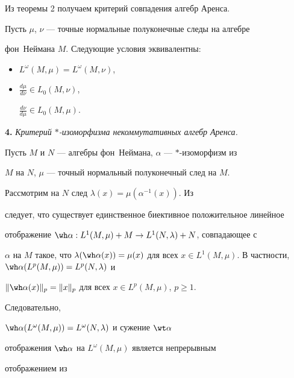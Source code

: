  


Из теоремы 2 получаем критерий совпадения алгебр Аренса. 


 


\begin{cornonum} 


Пусть $\mu$, $\nu$ --- точные нормальные полуконечные следы на алгебре 


фон~Неймана $M$. Следующие условия эквивалентны$:$ 


\begin{itemize} 


\item[(i)] $L^\omega(M,\mu)=L^\omega(M,\nu)$, 


\item[(ii)] $\frac{d\mu}{d\nu}\in L_0(M,\nu)$, 


$\frac{d\nu}{d\mu}\in L_0(M,\mu)$. 


\end{itemize} 


\end{cornonum} 


 


{\bf 4.} {\it Критерий $*$-изоморфизма некоммутативных алгебр Аренса.} 


Пусть $M$ и $N$ --- алгебры фон~Неймана, $\alpha$ --- $*$-изоморфизм из 


$M$ на $N$, $\mu$ --- точный нормальный полуконечный след на $M$. 


Рассмотрим на $N$ след $\lambda(x)=\mu(\alpha^{-1}(x))$. Из \cite{10} 


следует, что существует единственное биективное положительное линейное 


отображение $\wh\alpha:L^1(M,\mu)+M\to L^1(N,\lambda)+N$, совпадающее с 


$\alpha$ на $M$ такое, что $\lambda(\wh\alpha(x))=\mu(x)$ для всех $x\in 


L^1(M,\mu)$. В частности, $\wh\alpha(L^p(M,\mu))=L^p(N,\lambda)$ и 


$\|\wh\alpha(x)\|_p=\|x\|_p$ для всех $x\in L^p(M,\mu)$, $p\ge 1$. 


Следовательно, 


$\wh\alpha(L^\omega(M,\mu))=L^\omega(N,\lambda)$ и сужение $\wt\alpha$ 


отображения $\wh\alpha$ на $L^\omega(M,\mu)$ является непрерывным 


отображением из 


